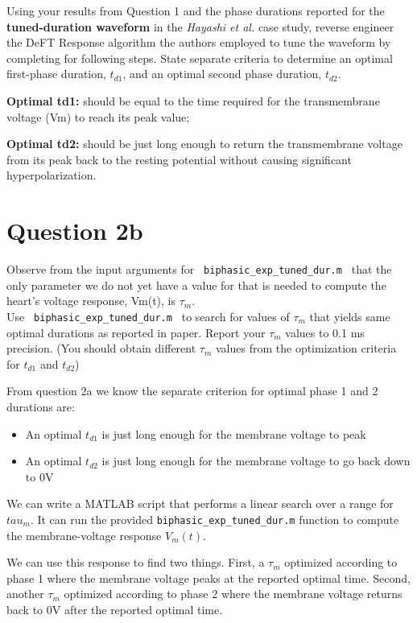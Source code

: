 \documentclass[]{report}
\begin{document}
Using your results from Question 1 and the phase durations reported for the \textbf{tuned-duration 
waveform} in the \textit{Hayashi et al.} case study, reverse engineer the DeFT Response algorithm the 
authors employed to tune the waveform by completing for following steps. State separate criteria to determine an optimal first-phase duration, $t_{d1}$, and an optimal second
phase duration, $t_{d2}$.

\textbf{Optimal td1:} should be equal to the time required for the transmembrane voltage (Vm) to reach its peak value;

\textbf{Optimal td2:} should be just long enough to return the transmembrane voltage from its peak back to the resting potential without causing significant hyperpolarization.


\section*{Question 2b}

Observe from the input arguments for \texttt{ biphasic\_exp\_tuned\_dur.m } that the only parameter 
we do not yet have a value for that is needed to compute the heart’s voltage response, Vm(t), is $\tau_m$.\\ 
Use \texttt{ biphasic\_exp\_tuned\_dur.m } to search for values of $\tau_m$ that yields same optimal durations as reported in paper. Report your $\tau_m$ values to 0.1 ms precision. (You should obtain different $\tau_m$ values from the optimization criteria for $t_{d1}$ and $t_{d2}$)

From question 2a  we know the separate criterion for optimal phase 1 and 2 durations are:
\begin{itemize}
	\item An optimal $t_{d1}$ is just long enough for the membrane voltage to peak
	\item An optimal $t_{d2}$ is just long enough for the membrane voltage to go back down to 0V
\end{itemize}

We can write a MATLAB script that performs a linear search over a range  for $tau_m$. It can run the provided \texttt{biphasic\_exp\_tuned\_dur.m} function to compute the membrane-voltage response $V_m(t)$.

We can use this response to find two things. First, a $\tau_m$ optimized according to phase 1 where the membrane voltage peaks at the reported optimal time. Second, another $\tau_m$ optimized according to phase 2 where the membrane voltage returns back to 0V after the reported optimal time.
\end{document}
